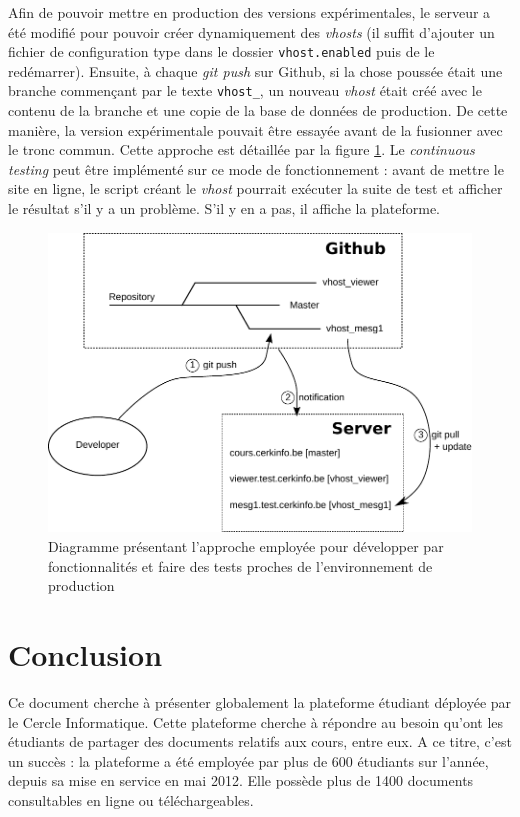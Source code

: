 \documentclass[a4paper,12pt]{article}
\begin{document}
Afin de pouvoir mettre en production des versions expérimentales, le serveur a été
modifié pour pouvoir créer dynamiquement des \textit{vhosts} (il suffit d'ajouter un
fichier de configuration type dans le dossier \texttt{vhost.enabled} puis de le redémarrer).
Ensuite, à chaque \textit{git push} sur Github, si la chose poussée était une
branche commençant par le texte \texttt{vhost\_}, un nouveau \textit{vhost} était créé avec
le contenu de la branche et une copie de la base de données de production.
De cette manière, la version expérimentale pouvait être essayée avant de la
fusionner avec le tronc commun. Cette approche est détaillée par la figure \ref{fig:git}.
Le \textit{continuous testing} peut être implémenté sur ce mode de fonctionnement : avant
de mettre le site en ligne, le script créant le \textit{vhost} pourrait exécuter la suite
de test et afficher le résultat s'il y a un problème. S'il y en a pas, il affiche
la plateforme.

\begin{figure}
  \centering\includegraphics[scale=0.9]{imgs/git.pdf}
  \caption{Diagramme présentant l'approche employée pour développer par fonctionnalités
           et faire des tests proches de l'environnement de production}
  \label{fig:git}
\end{figure}


\section{Conclusion}

Ce document cherche à présenter globalement la plateforme étudiant déployée par le
Cercle Informatique. Cette plateforme cherche à répondre au besoin qu'ont les étudiants
de partager des documents relatifs aux cours, entre eux. A ce titre, c'est un succès :
la plateforme a été employée par plus de 600 étudiants sur l'année, depuis sa mise en
service en mai 2012. Elle possède plus de 1400 documents consultables en ligne ou
téléchargeables.
\end{document}
